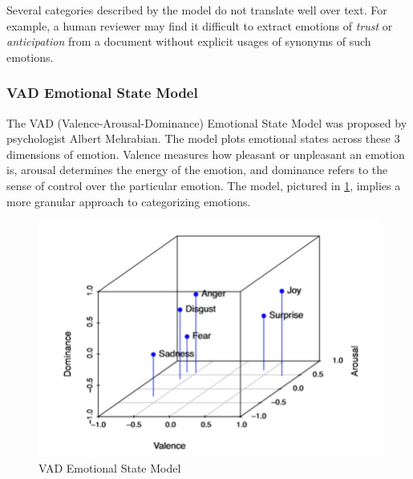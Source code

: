 \documentclass[11pt]{article}
\begin{document}

Several categories described by the model do not translate well over text. For example, a human reviewer may find it difficult to extract emotions of \textit{trust} or \textit{anticipation} from a document without explicit usages of synonyms of such emotions.

\subsubsection{VAD Emotional State Model}

The VAD (Valence-Arousal-Dominance) Emotional State Model was proposed by psychologist Albert Mehrabian. The model plots emotional states across these 3 dimensions of emotion. Valence measures how pleasant or unpleasant an emotion is, arousal determines the energy of the emotion, and dominance refers to the sense of control over the particular emotion. The model, pictured in \ref{fig:vad}, implies a more granular approach to categorizing emotions.

\begin{figure}[!ht]
  \includegraphics[scale=0.35]{../statics/vad_.png}
  \centering
  \caption{VAD Emotional State Model}
  \label{fig:vad}
\end{figure}
\end{document}
